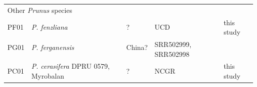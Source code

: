 \documentclass[12pt]{article}
\begin{document}
\begin{center}
\begin{longtable}{lllll}
		\\
                 \multicolumn{5}{l}{Other \emph{Prunus} species}  \\
                 PF01 &\emph{P. fenzliana} &? &UCD &this study\\
                 PG01 &\emph{P. ferganensis} &China? &\multirow{2}{1cm}{SRR502999, SRR502998} &\citealt{verde2013high}\\
                 \\
                 PC01 &\emph{P. cerasifera} DPRU 0579, Myrobalan &? &NCGR &this study\\ \hline

\end{longtable}
\end{center}
\end{document}
